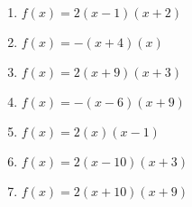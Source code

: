 \documentclass{article}%
\begin{document}
\begin{enumerate}[label=\alph*)]
\item%
\newline\vspace{0.5cm} $f(x)=2(x-1)(x+2)$%
\item%
\newline\vspace{0.5cm} $f(x)=-(x+4)(x)$%
\item%
\newline\vspace{0.5cm} $f(x)=2(x+9)(x+3)$%
\item%
\newline\vspace{0.5cm} $f(x)=-(x-6)(x+9)$%
\item%
\newline\vspace{0.5cm} $f(x)=2(x)(x-1)$%
\item%
\newline\vspace{0.5cm} $f(x)=2(x-10)(x+3)$%
\item%
\newline\vspace{0.5cm} $f(x)=2(x+10)(x+9)$%
\end{enumerate}

%
\end{document}
